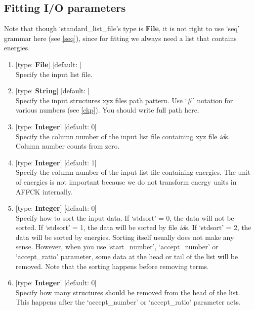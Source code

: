 \documentclass[11pt]{book}
\begin{document}
\subsection{Fitting I/O parameters}

Note that though `standard\_list\_file's type is \textbf{File}, it is not right to use `seq' grammar here (see \ref{seq}), since for fitting we always 
need a list that contains energies.

\begin{enumerate}
\item {} [type: \textbf{File}] [default: ] \\
	Specify the input list file.
\item {} [type: \textbf{String}] [default: ] \\
	Specify the input structures xyz files path pattern. Use `\#' notation for various numbers (see \ref{ckp}). 
	You should write full path here.
\item {} [type: \textbf{Integer}] [default: 0] \\
	Specify the column number of the input list file containing xyz file \emph{id}s. Column number counts from zero.
\item {} [type: \textbf{Integer}] [default: 1] \\
	Specify the column number of the input list file containing energies. The unit of energies is not important because we do not transform 
	energy units in AFFCK internally.
\item {} [type: \textbf{Integer}] [default: 0] \\
	Specify how to sort the input data. If `stdsort' = 0, the data will not be sorted. If `stdsort' = 1, the data will be sorted by file \emph{id}s. 
	If `stdsort' = 2, the data will be sorted by energies. Sorting itself usually does not make any sense. However, when you use `start\_number', 
	`accept\_number' or `accept\_ratio' parameter, some data at the head or tail of the list will be removed. Note that the sorting happens before removing terms. 
\item {} [type: \textbf{Integer}] [default: 0] \\
	Specify how many structures should be removed from the head of the list. This happens after the `accept\_number' or `accept\_ratio' parameter acts.

\end{enumerate}
\end{document}
